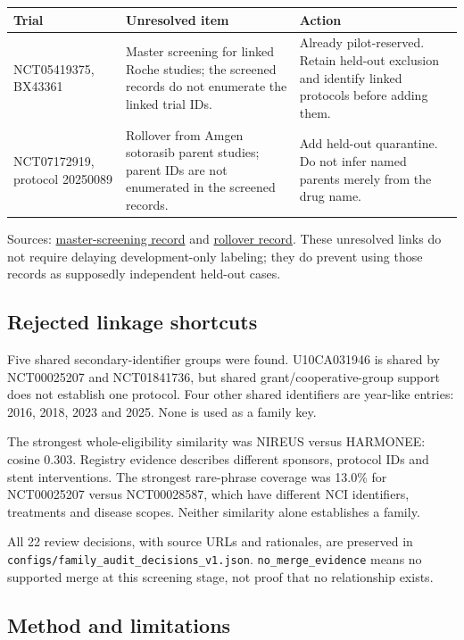 \documentclass[10pt,letterpaper]{article}
\newcommand{\pathcode}[1]{\nolinkurl{#1}}
\begin{document}
\begin{longtable}{L{.20\linewidth}L{.34\linewidth}L{.34\linewidth}}
\toprule\noalign{}
Trial & Unresolved item & Action \\
\midrule\noalign{}
\endhead
\bottomrule\noalign{}
\endlastfoot
NCT05419375, BX43361 & Master screening for linked Roche studies; the screened records do not enumerate the linked trial IDs. & Already pilot-reserved. Retain held-out exclusion and identify linked protocols before adding them. \\
NCT07172919, protocol 20250089 & Rollover from Amgen sotorasib parent studies; parent IDs are not enumerated in the screened records. & Add held-out quarantine. Do not infer named parents merely from the drug name. \\
\end{longtable}

Sources: \href{https://clinicaltrials.gov/api/v2/studies/NCT05419375}{master-screening record} and \href{https://clinicaltrials.gov/api/v2/studies/NCT07172919}{rollover record}. These unresolved links do not require delaying development-only labeling; they do prevent using those records as supposedly independent held-out cases.

\subsection{Rejected linkage shortcuts}\label{audit-rejected-linkage-shortcuts}

Five shared secondary-identifier groups were found. U10CA031946 is shared by NCT00025207 and NCT01841736, but shared grant/cooperative-group support does not establish one protocol. Four other shared identifiers are year-like entries: 2016, 2018, 2023 and 2025. None is used as a family key.

The strongest whole-eligibility similarity was NIREUS versus HARMONEE: cosine 0.303. Registry evidence describes different sponsors, protocol IDs and stent interventions. The strongest rare-phrase coverage was 13.0\% for NCT00025207 versus NCT00028587, which have different NCI identifiers, treatments and disease scopes. Neither similarity alone establishes a family.

All 22 review decisions, with source URLs and rationales, are preserved in \pathcode{configs/family_audit_decisions_v1.json}. \pathcode{no_merge_evidence} means no supported merge at this screening stage, not proof that no relationship exists.

\subsection{Method and limitations}\label{audit-method-and-limitations}
\end{document}
